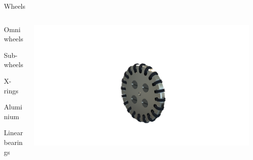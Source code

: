 
\begin{frame}{Wheels}

    \begin{columns}[T]
        \begin{column}{0.7\textwidth}

            \vspace{2cm}

            Omni wheels

            Sub-wheels

            X-rings

            Aluminium

            Linear bearings
    
        \end{column}
        \begin{column}{0.3\textwidth}
    
            \begin{adjustbox}{scale=4.5,center,margin={-2.5cm,0cm,0cm,0cm}}
                \includegraphics[width=1\textwidth]{image/png/wheel_render.png}
            \end{adjustbox}
        
        \end{column}
    \end{columns}

\end{frame}


\begin{frame}[plain]

    \begin{adjustbox}{scale=1,center,margin={0cm,-3cm,0cm,0cm}}
    \end{adjustbox}
    
\end{frame}

